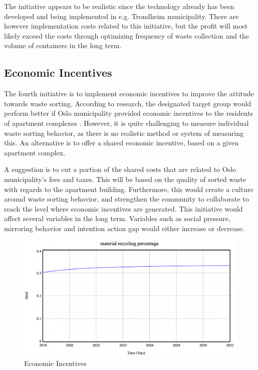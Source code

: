 \indent \newline
The initiative appears to be realistic since the technology already has been developed and being implemented in e.g. Trondheim municipality. There are however implementation costs related to this initiative, but the profit will most likely exceed the costs through optimizing frequency of waste collection and the volume of containers in the long term. 

\subsection{Economic Incentives}

\indent \newline
The fourth initiative is to implement economic incentives to improve the attitude towards waste sorting. According to research, the designated target group would perform better if Oslo municipality provided economic incentives to the residents of apartment complexes \cite[p. 46]{Mikkelborg}. However, it is quite challenging to measure individual waste sorting behavior, as there is no realistic method or system of measuring this. An alternative is to offer a shared economic incentive, based on a given apartment complex. 

\indent \newline
A suggestion is to cut a portion of the shared costs that are related to Oslo municipality's fees and taxes. This will be based on the quality of sorted waste with regards to the apartment building. Furthermore, this would create a culture around waste sorting behavior, and strengthen the community to collaborate to reach the level where economic incentives are generated. This initiative would affect several variables in the long term. Variables such as social pressure, mirroring behavior and intention action gap would either increase or decrease.

\begin{figure}[H]
\centering
\includegraphics [scale=0.26,angle=360]{figures/incentives.png}
\caption{Economic Incentives}
\label{fig:incentives}
\end{figure}

